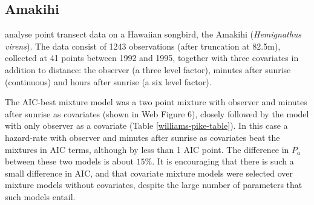 \documentclass[useAMS,referee,usenatbib]{biom}
\begin{document}
\subsection{Amakihi}
\label{s:amakihi}

\cite{Marques:2007vm} analyse point transect data on a Hawaiian songbird, the Amakihi (\textit{Hemignathus virens}). The data consist of 1243 observations (after truncation at 82.5m), collected at 41 points between 1992 and 1995, together with three covariates in addition to distance: the observer (a three level factor), minutes after sunrise (continuous) and hours after sunrise (a six level factor).

The AIC-best mixture model was a two point mixture with observer and minutes after sunrise as covariates (shown in Web Figure 6), closely followed by the model with only observer as a covariate (Table \ref{williams-pike-table}). In this case a hazard-rate with observer and minutes after sunrise as covariates beat the mixtures in AIC terms, although by less than 1 AIC point. The difference in $P_a$ between these two models is about $15\%$.  It is encouraging that there is such a small difference in AIC, and that covariate mixture models were selected over mixture models without covariates, despite the large number of parameters that such models entail.
\end{document}
